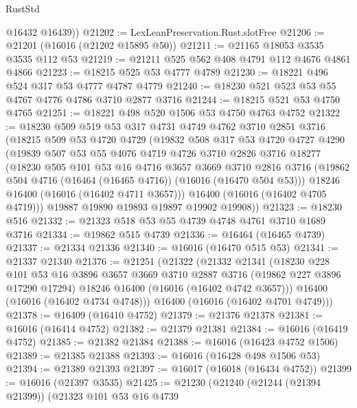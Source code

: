 \begin{lexlean}{RustStd}
\begin{coremodule}
        @16432
        @16439))
@21202 := LexLeanPreservation.Rust.slotFree
@21206 := @21201 (@16016 (@21202 @15895 @50))
@21211 := @21165 @18053 @3535 @3535 @112 @53
@21219 := @21211 @525 @562 @408 @4791 @112 @4676 @4861 @4866
@21223 := @18215 @525 @53 @4777 @4789
@21230 := @18221 @496 @524 @317 @53 @4777 @4787 @4779
@21240 := @18230 @521 @523 @53 @55 @4767 @4776 @4786 @3710 @2877 @3716
@21244 := @18215 @521 @53 @4750 @4765
@21251 := @18221 @498 @520 @1506 @53 @4750 @4763 @4752
@21322 := @18230
    @509
    @519
    @53
    @317
    @4731
    @4749
    @4762
    @3710
    @2851
    @3716
    (@18215
      @509
      @53
      @4720
      @4729
      (@19832
        @508
        @317
        @53
        @4720
        @4727
        @4290
        (@19839
          @507
          @53
          @55
          @4076
          @4719
          @4726
          @3710
          @2826
          @3716
          @18277
          (@18230
            @505
            @101
            @53
            @16
            @4716
            @3657
            @3669
            @3710
            @2816
            @3716
            (@19862 @504 @4716 (@16464 (@16465 @4716)) (@16016 (@16470 @504 @53)))
            @18246
            @16400
            (@16016 (@16402 @4711 @3657)))
          @16400
          (@16016 (@16402 @4705 @4719)))
        @19887
        @19890
        @19893
        @19897
        @19902
        @19908))
@21323 := @18230 @516
@21332 := @21323 @518 @53 @55 @4739 @4748 @4761 @3710 @1689 @3716
@21334 := @19862 @515 @4739
@21336 := @16464 (@16465 @4739)
@21337 := @21334 @21336
@21340 := @16016 (@16470 @515 @53)
@21341 := @21337 @21340
@21376 := @21251
    (@21322
      (@21332
        @21341
        (@18230
          @228
          @101
          @53
          @16
          @3896
          @3657
          @3669
          @3710
          @2887
          @3716
          (@19862 @227 @3896 @17290 @17294)
          @18246
          @16400
          (@16016 (@16402 @4742 @3657)))
        @16400
        (@16016 (@16402 @4734 @4748)))
      @16400
      (@16016 (@16402 @4701 @4749)))
@21378 := @16409 (@16410 @4752)
@21379 := @21376 @21378
@21381 := @16016 (@16414 @4752)
@21382 := @21379 @21381
@21384 := @16016 (@16419 @4752)
@21385 := @21382 @21384
@21388 := @16016 (@16423 @4752 @1506)
@21389 := @21385 @21388
@21393 := @16016 (@16428 @498 @1506 @53)
@21394 := @21389 @21393
@21397 := @16017 (@16018 (@16434 @4752))
@21399 := @16016 (@21397 @3535)
@21425 := @21230
    (@21240
      (@21244 (@21394 @21399))
      (@21323
        @101
        @53
        @16
        @4739

\end{coremodule}
\end{lexlean}
